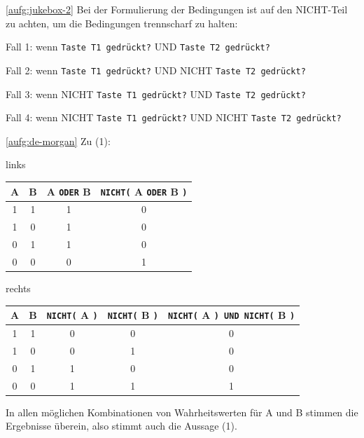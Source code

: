 \begin{loesung}{\ref{aufg:jukebox-2}}
	Bei der Formulierung der Bedingungen ist auf den NICHT-Teil zu achten, um die Bedingungen trennscharf zu halten:
	
	Fall 1: wenn \texttt{Taste T1 gedrückt?} UND \texttt{Taste T2 gedrückt?}
	
	Fall 2: wenn \texttt{Taste T1 gedrückt?} UND NICHT \texttt{Taste T2 gedrückt?}
	
	Fall 3: wenn NICHT \texttt{Taste T1 gedrückt?} UND \texttt{Taste T2 gedrückt?}
	
	Fall 4: wenn NICHT \texttt{Taste T1 gedrückt?} UND NICHT \texttt{Taste T2 gedrückt?}
\end{loesung}

\begin{loesung}{\ref{aufg:de-morgan}}
	Zu (1):\smallskip
	
	\begin{minipage}{0.4\textwidth}
		\scriptsize
		links\smallskip
		
		\begin{tabular}{c|c|c|c}
			A & B & A \texttt{ODER} B & \texttt{NICHT(} A \texttt{ODER} B \texttt{)} \\ \hline
			1 & 1 & 1 		 & 0 \\ \hline
			1 & 0 & 1 		 & 0 \\ \hline
			0 & 1 & 1 		 & 0 \\ \hline
			0 & 0 & 0 		 & 1 \\
		\end{tabular}
	\end{minipage}
	\hfill
	\begin{minipage}{0.58\textwidth}
		\scriptsize
		rechts\smallskip
		
		\begin{tabular}{c|c|c|c|c}
			A & B & \texttt{NICHT(} A \texttt{)} & \texttt{NICHT(} B \texttt{)} & \texttt{NICHT(} A \texttt{) UND NICHT(} B \texttt{)} \\ \hline
			1 & 1 & 0 		   & 0          & 0 \\ \hline
			1 & 0 & 0 		   & 1          & 0 \\ \hline
			0 & 1 & 1 		   & 0          & 0 \\ \hline
			0 & 0 & 1 		   & 1          & 1 \\ 
		\end{tabular}			
	\end{minipage}

	In allen möglichen Kombinationen von Wahrheitswerten für A und B stimmen die Ergebnisse überein, also stimmt auch die Aussage (1).
	

\end{loesung}
